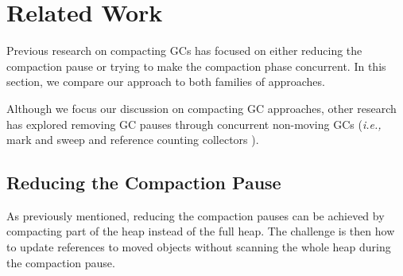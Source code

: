 \documentclass[sigplan,10pt,review,anonymous]{acmart}\settopmatter{printfolios=true,printccs=false,printacmref=false}
\def\ie{\emph{i.e., }}
\begin{document}
\section{Related Work}
\label{sec:relWork}

Previous research on compacting GCs has focused on either reducing the compaction pause or trying to make the compaction phase concurrent. In this section, we compare our approach to both families of approaches. 

Although we focus our discussion on compacting GC approaches, other research has explored removing GC pauses through concurrent non-moving GCs (\ie mark and sweep and reference counting collectors \cite{ConcNonMovingGC,ConcNonMovingGC2,CMSGC,ConcRefCount}). 

\subsection{Reducing the Compaction Pause}

As previously mentioned, reducing the compaction pauses can be achieved by compacting part of the heap instead of the full heap. The challenge is then how to update references to moved objects without scanning the whole heap during the compaction pause.
\end{document}
